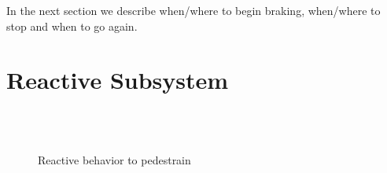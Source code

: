 \documentclass[letterpaper, 10 pt, conference]{ieeeconf}  %
\begin{document}
In the next section we describe when/where to begin braking, when/where to stop
and when to go again.

\section{Reactive Subsystem} \label{sec:reactiveubsystem}

\begin{figure}[thpb]
\centering
\\
\\
  \caption{Reactive behavior to pedestrain}
  \label{fig:react}
\end{figure}
\end{document}
